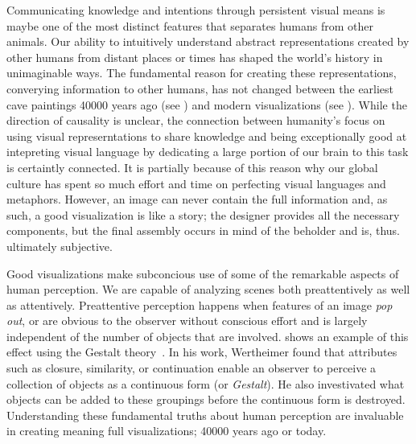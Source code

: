Communicating knowledge and intentions through persistent visual means is maybe one of the most distinct features that separates humans from other animals.  Our ability to intuitively understand abstract representations created by other humans from distant places or times has shaped the world's history in unimaginable ways.  The fundamental reason for creating these representations, converying information to other humans, has not changed between the earliest cave paintings 40000 years ago (see ) and modern visualizations (see ).  While the direction of causality is unclear, the connection between humanity's focus on using visual represerntations to share knowledge and being exceptionally good at intepreting visual language by dedicating a large portion of our brain to this task is certaintly connected.  It is partially because of this reason why our global culture has spent so much effort and time on perfecting visual languages and metaphors.  However, an image can never contain the full information and, as such, a good visualization is like a story;  the designer provides all the necessary components, but the final assembly occurs in mind of the beholder and is, thus. ultimately subjective.

Good visualizations make subconcious use of some of the remarkable aspects of human perception.  We are capable of analyzing scenes both preattentively as well as attentively.  Preattentive perception happens when features of an image \emph{pop out}, or are obvious to the observer without conscious effort and is largely independent of the number of objects that are involved.   shows an example of this effect using the Gestalt theory~\cite{wertheimer1922untersuchungen}.  In his work, Wertheimer found that attributes such as closure, similarity, or continuation enable an observer to perceive a collection of objects as a continuous form (or \emph{Gestalt}).  He also investivated what objects can be added to these groupings before the continuous form is destroyed.  Understanding these fundamental truths about human perception are invaluable in creating meaning full visualizations;  40000 years ago or today.

